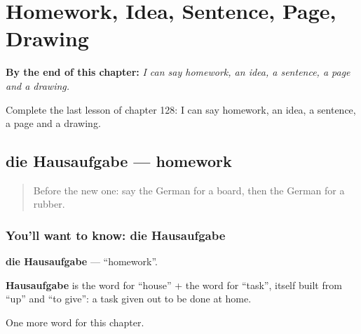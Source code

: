 
\chapter{Homework, Idea, Sentence, Page, Drawing}
\label{ch:ge-homework-idea-sentence-page-drawing}

\begin{chapteropening}
\textbf{By the end of this chapter:} \emph{I can say homework, an idea, a sentence, a page and a drawing.}

Complete the last lesson of chapter 128: I can say homework, an idea, a sentence, a page and a drawing.
\end{chapteropening}

\section[die Hausaufgabe]{die Hausaufgabe — homework}

\label{lesson:GE-C128-hausaufgabe}



\begin{quote}
Before the new one: say the German for a board, then the German for a rubber.
\end{quote}

\subsection*{You'll want to know: die Hausaufgabe}
\textbf{die Hausaufgabe} — \textquotedblleft{}homework\textquotedblright{}.

\begin{cousinweb}
\textbf{Hausaufgabe} is the word for \textquotedblleft{}house\textquotedblright{} + the word for \textquotedblleft{}task\textquotedblright{}, itself built from \textquotedblleft{}up\textquotedblright{} and \textquotedblleft{}to give\textquotedblright{}: a task given out to be done at home.
\end{cousinweb}

\begin{grammarlens}[title={What you've built}]
One more word for this chapter.
\end{grammarlens}

